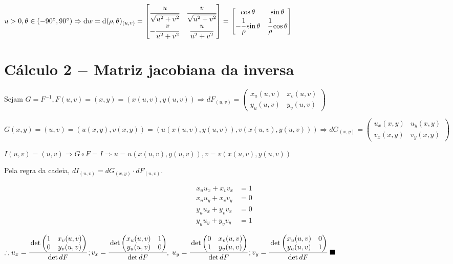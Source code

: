 \documentclass[10pt,a4paper]{article}
\begin{document}
		$u > 0, \theta \in (-90^\circ, 90^\circ) \Rightarrow \mathrm{d}w = \mathrm{d}(\rho,\theta)_{(u,v)} = \left[ \begin{matrix} \cfrac{u}{\sqrt{u^2 + v^2}} & \cfrac{v}{\sqrt{u^2 + v^2}} \\ -\cfrac{v}{u^2 + v^2} & \cfrac{u}{u^2 + v^2} \end{matrix} \right]  = \left[ \begin{matrix} \cos \theta & \sin \theta \\ - \cfrac{1}{\rho} \sin \theta & \cfrac{1}{\rho} \cos \theta \end{matrix} \right]$

		\section{C\'alculo 2 $-$ Matriz jacobiana da inversa}
		\begin{flushright}
		\end{flushright}

		Sejam $G = F^{-1}, F(u,v) = (x, y) = (x(u,v), y(u,v)) \Rightarrow dF_{(u,v)} = \left( \begin{matrix} x_u(u,v) & x_v(u,v) \\ y_u(u,v) & y_v(u,v) \end{matrix} \right)$

		$G(x,y) = (u,v) = (u(x,y), v(x,y)) = (u(x(u,v), y(u,v)), v(x(u,v), y(u,v))) \Rightarrow dG_{(x,y)} = \left( \begin{matrix} u_x(x,y) & u_y(x,y) \\ v_x(x,y) & v_y(x,y) \end{matrix} \right)$

		$I(u,v) = (u,v) \Rightarrow G \circ F = I \Rightarrow u = u(x(u,v),y(u,v)), v = v(x(u,v),y(u,v))$

		Pela regra da cadeia, $dI_{(u,v)} = dG_{(x,y)} \cdot dF_{(u,v)}$.

		\begin{align*}
		x_u u_x + x_v v_x &= 1 \\
		x_u u_y + x_v v_y &= 0 \\
		y_u u_x + y_v v_x &= 0 \\
		y_u u_y + y_v v_y &= 1
		\end{align*}

		$\therefore u_x = \cfrac{\det \left( \begin{matrix} 1 & x_v(u,v) \\ 0 & y_v(u,v) \end{matrix} \right)}{\det dF}\,;v_x = \cfrac{\det \left( \begin{matrix} x_u(u,v) & 1 \\ y_u(u,v) & 0 \end{matrix} \right)}{\det dF},\;u_y = \cfrac{\det \left( \begin{matrix} 0 & x_v(u,v) \\ 1 & y_v(u,v) \end{matrix} \right)}{\det dF}\,;v_y = \cfrac{\det \left( \begin{matrix} x_u(u,v) & 0 \\ y_u(u,v) & 1 \end{matrix} \right)}{\det dF}\,\,\blacksquare$
\end{document}
